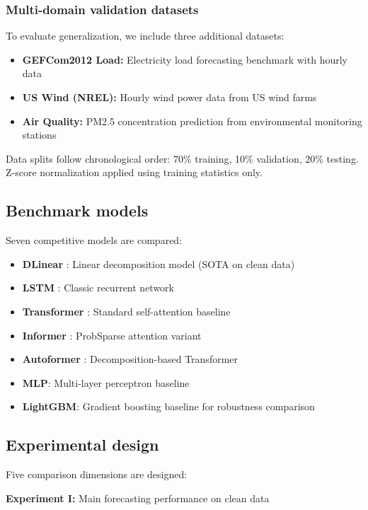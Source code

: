 \documentclass[review,3p,times,draft]{elsarticle}
\begin{document}
\subsubsection{Multi-domain validation datasets}
To evaluate generalization, we include three additional datasets:
\begin{itemize}[leftmargin=*]
    \item \textbf{GEFCom2012 Load:} Electricity load forecasting benchmark with hourly data
    \item \textbf{US Wind (NREL):} Hourly wind power data from US wind farms
    \item \textbf{Air Quality:} PM2.5 concentration prediction from environmental monitoring stations
\end{itemize}

Data splits follow chronological order: 70\% training, 10\% validation, 20\% testing. Z-score normalization applied using training statistics only.

\subsection{Benchmark models}
Seven competitive models are compared:

\begin{itemize}[leftmargin=*]
    \item \textbf{DLinear} \cite{zeng2023dlinear}: Linear decomposition model (SOTA on clean data)
    \item \textbf{LSTM} \cite{hochreiter1997long}: Classic recurrent network
    \item \textbf{Transformer} \cite{vaswani2017attention}: Standard self-attention baseline
    \item \textbf{Informer} \cite{zhou2021informer}: ProbSparse attention variant
    \item \textbf{Autoformer} \cite{wu2021autoformer}: Decomposition-based Transformer
    \item \textbf{MLP}: Multi-layer perceptron baseline
    \item \textbf{LightGBM}: Gradient boosting baseline for robustness comparison
\end{itemize}

\subsection{Experimental design}
Five comparison dimensions are designed:

\textbf{Experiment I:} Main forecasting performance on clean data
\end{document}
